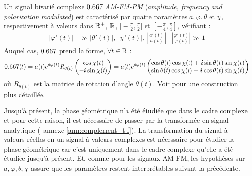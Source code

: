 \begin{definition}[Signal AM-FM-PM] \label{def:AM-FM-PM}
	Un signal bivarié complexe $\x$ \emph{AM-FM-PM} (\emph{amplitude, frequency and polarization modulated}) est caractérisé par quatre paramètres $a,\varphi,\theta$ et $\chi$, respectivement à valeurs dans $\mathbb{R}^+$, $\mathbb{R}$, $]-\frac{\pi}{2}, \frac{\pi}{2}]$ et $[-\frac{\pi}{4}, \frac{\pi}{4}]$, vérifiant :
	\begin{align}\label{eq:condi_AM-FM-PM}
		\big| \varphi'(t) \big| &\gg \big| \theta'(t) \big| ,\ \big| \chi'(t) \big| ,\ \left| \frac{a'(t)}{a(t)}\right|  &  \left| \frac{\varphi'(t)}{\varphi(t)}\right| \gg 1
	\end{align}
	Auquel cas, $\x$ prend la forme, $\forall t\in\mathbb{R}$ :
	\begin{equation}\label{eq:AM-FM-PM}
		\x(t) = a(t)e^{\i \varphi(t)} R_{\theta(t)} \begin{pmatrix} \cos\chi(t) \\ -\i\sin\chi(t) \end{pmatrix} 
		= a(t)e^{\i \varphi(t)} \begin{pmatrix} \cos\theta(t) \cos\chi(t) + \i\sin\theta(t) \sin\chi(t) \\ \sin\theta(t) \cos\chi(t) - \i\cos\theta(t) \sin\chi(t) \end{pmatrix}
	\end{equation}
	où $R_{\theta(t)}$ est la matrice de rotation d'angle $\theta(t)$. Voir \cite[ann. 4.B]{flamant_approche_2018} pour une construction plus détaillée.
\end{definition}
\skipl

Jusqu'à présent, la phase géométrique n'a été étudiée que dans le cadre complexe et pour cette raison, il est nécessaire de passer par la transformée en signal analytique (\cf~annexe \cref{ann:complement_t-f}).
La transformation du signal à valeurs réelles en un signal à valeurs complexes est nécessaire pour étudier la phase géométrique car c'est uniquement dans le cadre complexe qu'elle a été étudiée jusqu'à présent. 
Et, comme pour les signaux AM-FM, les hypothèses sur $a,\varphi,\theta,\chi$ assure que les paramètres restent interprétables suivant la  précédente.
\\

